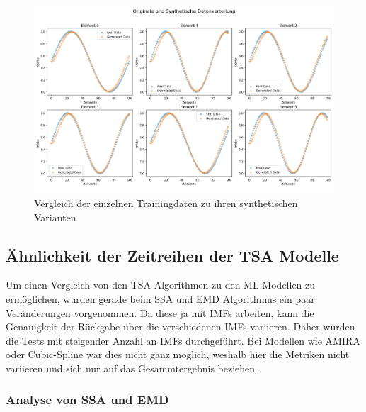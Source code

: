 \begin{figure}[ht]
    \centering
    \includegraphics[width=1\textwidth]{includes/figures/graphs/sinus_plot_histgram_compare.png}
    \caption{Vergleich der einzelnen Trainingdaten zu ihren synthetischen Varianten}
    \label{fig:sinus_histogram_compare}
\end{figure}


\subsection{Ähnlichkeit der Zeitreihen der TSA Modelle}
\label{sec:similarity_of_time_series_tsa}
Um einen Vergleich von den \ac{TSA} Algorithmen zu den \ac{ML} Modellen zu ermöglichen, wurden gerade beim \ac{SSA} und \ac{EMD} Algorithmus ein paar Veränderungen vorgenommen.
Da diese ja mit \ac{IMF}s arbeiten, kann die Genauigkeit der Rückgabe über die verschiedenen \ac{IMF}s variieren. Daher wurden die Tests mit steigender Anzahl an \ac{IMF}s durchgeführt.
Bei Modellen wie AMIRA oder Cubic-Spline war dies nicht ganz möglich, weshalb hier die Metriken nicht variieren und sich nur auf das Gesammtergebnis beziehen.


\subsubsection{Analyse von \ac{SSA} und \ac{EMD}}



